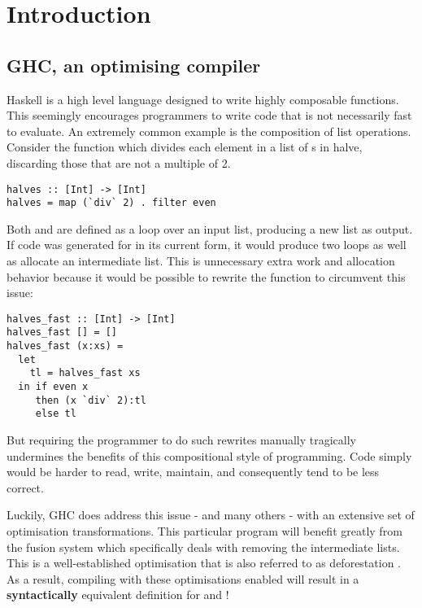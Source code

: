 \chapter{Introduction}

\section{GHC, an optimising compiler}

Haskell is a high level language designed to write highly composable functions.
This seemingly encourages programmers to write code that
is not necessarily fast to evaluate. An extremely common example is the composition
of list operations. Consider the function  which divides each element
in a list of s in halve, discarding those that are not a multiple of 2.

\begin{listing}[H]
\begin{verbatim}
halves :: [Int] -> [Int]
halves = map (`div` 2) . filter even
\end{verbatim}
\end{listing}

Both  and  are defined as a loop over an input list, producing a new list as output. 
If code was generated for  in its current form, it would produce two loops as well as allocate
an intermediate list. This is unnecessary extra work and allocation behavior because
it would be possible to rewrite the function to circumvent this issue:

\begin{listing}[H]
\begin{verbatim}
halves_fast :: [Int] -> [Int]
halves_fast [] = []
halves_fast (x:xs) = 
  let 
    tl = halves_fast xs 
  in if even x 
     then (x `div` 2):tl
     else tl
\end{verbatim}
\end{listing}

But requiring the programmer to do such rewrites manually tragically undermines
the benefits of this compositional style of programming. Code simply would be harder to read, write,
maintain, and consequently tend to be less correct. 

Luckily, GHC does address this issue - and many others - with an extensive set of optimisation transformations.
This particular program will benefit greatly from the fusion system which specifically deals with removing
the intermediate lists. This is a well-established optimisation that is also referred to as deforestation \cite{WADLER1990231}.
As a result, compiling with these optimisations enabled will result in a \textbf{syntactically} equivalent
definition for  and ! 

